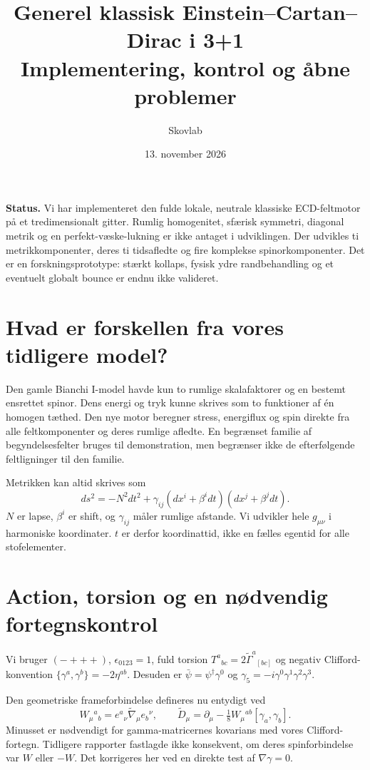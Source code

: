 \documentclass[11pt,a4paper]{article}
\title{Generel klassisk Einstein--Cartan--Dirac i 3+1\\\large Implementering, kontrol og åbne problemer}
\author{Skovlab}\date{13. november 2026}
\begin{document}
\maketitle
\textbf{Status.} Vi har implementeret den fulde lokale, neutrale klassiske ECD-feltmotor på et tredimensionalt gitter. Rumlig homogenitet, sfærisk symmetri, diagonal metrik og en perfekt-væske-lukning er ikke antaget i udviklingen. Der udvikles ti metrikkomponenter, deres ti tidsafledte og fire komplekse spinorkomponenter. Det er en forskningsprototype: stærkt kollaps, fysisk ydre randbehandling og et eventuelt globalt bounce er endnu ikke valideret.

\section{Hvad er forskellen fra vores tidligere model?}
Den gamle Bianchi I-model havde kun to rumlige skalafaktorer og en bestemt ensrettet spinor. Dens energi og tryk kunne skrives som to funktioner af én homogen tæthed. Den nye motor beregner stress, energiflux og spin direkte fra alle feltkomponenter og deres rumlige afledte. En begrænset familie af begyndelsesfelter bruges til demonstration, men begrænser ikke de efterfølgende feltligninger til den familie.

Metrikken kan altid skrives som
\[
 ds^2=-N^2dt^2+\gamma_{ij}(dx^i+\beta^idt)(dx^j+\beta^jdt).
\]
$N$ er lapse, $\beta^i$ er shift, og $\gamma_{ij}$ måler rumlige afstande. Vi udvikler hele $g_{\mu\nu}$ i harmoniske koordinater. $t$ er derfor koordinattid, ikke en fælles egentid for alle stofelementer.

\section{Action, torsion og en nødvendig fortegnskontrol}
Vi bruger $(-+++)$, $\epsilon_{0123}=1$, fuld torsion $T^a{}_{bc}=2\widetilde\Gamma^a{}_{[bc]}$ og negativ Clifford-konvention $\{\gamma^a,\gamma^b\}=-2\eta^{ab}$. Desuden er $\bar\psi=\psi^\dagger\gamma^0$ og $\gamma_5=-i\gamma^0\gamma^1\gamma^2\gamma^3$.

Den geometriske frameforbindelse defineres nu entydigt ved
\[
 W_\mu{}^a{}_b=e^a{}_\nu\widetilde\nabla_\mu e_b{}^\nu,
 \qquad \widetilde D_\mu=\partial_\mu-\tfrac18W_\mu{}^{ab}[\gamma_a,\gamma_b].
\]
Minusset er nødvendigt for gamma-matricernes kovarians med vores Clifford-fortegn. Tidligere rapporter fastlagde ikke konsekvent, om deres spinforbindelse var $W$ eller $-W$. Det korrigeres her ved en direkte test af $\nabla\gamma=0$.
\end{document}
